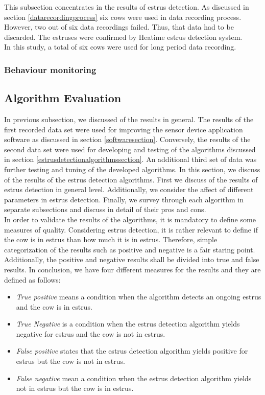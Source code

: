 \documentclass[english,12pt,a4paper,pdftex,elec,utf8]{aaltothesis}
\begin{document}
This subsection concentrates in the results of estrus detection. As discussed in section \ref{datarecordingprocess} six cows were used in data recording process. However, two out of six data recordings failed. Thus, that data had to be discarded. The estruses were confirmed by Heatime estrus detection system. \\
In this study, a total of six cows were used for long period data recording.

\subsubsection{Behaviour monitoring}

\subsection{Algorithm Evaluation} \label{algorithmevaluationsection}

In previous subsection, we discussed of the results in general. The results of the first recorded data set were used for improving the sensor device application software as discussed in section \ref{softwaresection}. Conversely, the results of the second data set were used for developing and testing of the algorithms discussed in section \ref{estrusdetectionalgorithmssection}. An additional third set of data was further testing and tuning of the developed algorithms. In this section, we discuss of the results of the estrus detection algorithms. First we discuss of the results of estrus detection in general level. Additionally, we consider the affect of different parameters in estrus detection. Finally, we survey through each algorithm in separate subsections and discuss in detail of their pros and cons. \\
In order to validate the results of the algorithms, it is mandatory to define some measures of quality. Considering estrus detection, it is rather relevant to define if the cow is in estrus than how much it is in estrus. Therefore, simple categorization of the results such as positive and negative is a fair staring point. Additionally, the positive and negative results shall be divided into true and false results. In conclusion, we have four different measures for the results and they are defined as follows:


\begin{itemize}
\item \textit{True positive} means a condition when the algorithm detects an ongoing estrus and the cow is in estrus.
\item \textit{True Negative} is a condition when the estrus detection algorithm yields negative for estrus and the cow is not in estrus.
\item \textit{False positive} states that the estrus detection algorithm yields positive for estrus but the cow is not in estrus.
\item \textit{False negative} mean a condition when the estrus detection algorithm yields not in estrus but the cow is in estrus.
\end{itemize}
\end{document}
